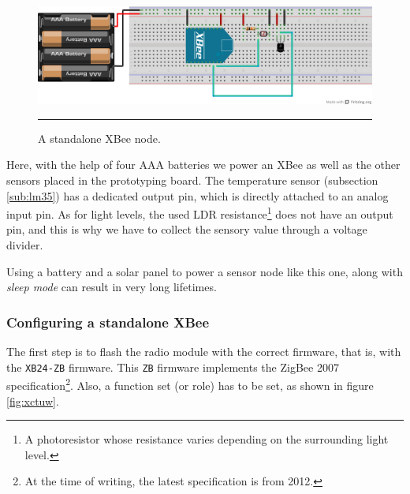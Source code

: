 \begin{figure}[htbp]
    \centering
        \includegraphics[scale=0.6]{./Figures/standalonexbee.png}
        \rule{35em}{0.5pt}
    \caption[Standalone XBee]{A standalone XBee node.}
    \label{fig:StandaloneXBee}
\end{figure}

Here, with the help of four AAA batteries we power an XBee\textregistered{} as well as the other sensors placed in the prototyping board. The temperature sensor (subsection \ref{sub:lm35}) has a dedicated output pin, which is directly attached to an analog input pin. As for light levels, the used LDR resistance\footnote{A photoresistor whose resistance varies depending on the surrounding light level.} does not have an output pin, and this is why we have to collect the sensory value through a voltage divider.

Using a battery and a solar panel to power a sensor node like this one, along with \emph{sleep mode} can result in very long lifetimes.

\subsubsection{Configuring a standalone XBee\textregistered{}}
\label{subsub:coxbee}

The first step is to flash the radio module with the correct firmware, that is, with the \texttt{XB24-ZB} firmware. This \texttt{ZB} firmware implements the ZigBee 2007 specification\footnote{At the time of writing, the latest specification is from 2012.}. Also, a function set (or role) has to be set, as shown in figure \ref{fig:xctuw}.

